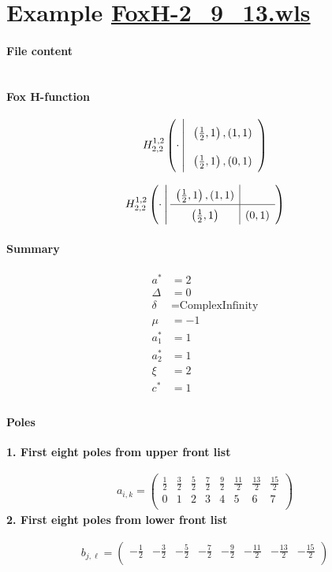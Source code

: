 \documentclass[11pt]{article}
\begin{document}
\section{Example \url{FoxH-2_9_13.wls}}

\paragraph{File content}

\inputminted{text}{FoxH-2_9_13.wls}

\paragraph{Fox H-function}

\begin{align*}
  \FoxH
    {1,2}
    {2,2}
    {\cdot}
    {\left(\frac{1}{2}, 1\right), \left(1, 1\right)}
    {\left(\frac{1}{2}, 1\right), \left(0, 1\right)}
\end{align*}

\begin{align*}
  \FoxHext
    {1,2}
    {2,2}
    {\cdot}
    {\left(\frac{1}{2}, 1\right), \left(1, 1\right)}
    {}
    {\left(\frac{1}{2}, 1\right)}
    {\left(0, 1\right)}
\end{align*}

\paragraph{Summary}

\begin{align*}
  a^*    & = 2 \\
  \Delta & = 0 \\
  \delta & = \text{ComplexInfinity} \\
  \mu    & = -1 \\
  a_1^*  & = 1 \\
  a_2^*  & = 1 \\
  \xi    & = 2 \\
  c^*    & = 1 \\
\end{align*}

\paragraph{Poles}

\noindent\textbf{1. First eight poles from upper front list}

\begin{align*}
  a_{i,k} = 
  \left(
\begin{array}{cccccccc}
 \frac{1}{2} & \frac{3}{2} & \frac{5}{2} & \frac{7}{2} & \frac{9}{2} & \frac{11}{2} & \frac{13}{2} & \frac{15}{2} \\
 0 & 1 & 2 & 3 & 4 & 5 & 6 & 7 \\
\end{array}
\right)
\end{align*}
\noindent\textbf{2. First eight poles from lower front list}

\begin{align*}
  b_{j,\ell} = 
  \left(
\begin{array}{cccccccc}
 -\frac{1}{2} & -\frac{3}{2} & -\frac{5}{2} & -\frac{7}{2} & -\frac{9}{2} & -\frac{11}{2} & -\frac{13}{2} & -\frac{15}{2} \\
\end{array}
\right)
\end{align*}

\printbibliography[title={References}]
\end{document}
